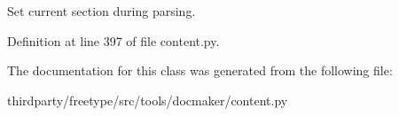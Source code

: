 \begin{DoxyVerb}Set current section during parsing.\end{DoxyVerb}
 

Definition at line 397 of file content.\+py.



The documentation for this class was generated from the following file\+:\begin{DoxyCompactItemize}
\item 
thirdparty/freetype/src/tools/docmaker/content.\+py\end{DoxyCompactItemize}
